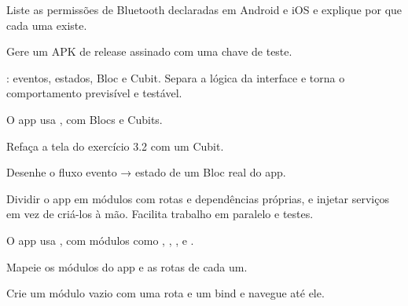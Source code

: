 \begin{pratique}
  \item Liste as permissões de Bluetooth declaradas em Android e iOS e explique por que cada uma existe.
  \item Gere um APK de release assinado com uma chave de teste.
\end{pratique}


: eventos, estados, Bloc e Cubit. Separa a lógica da interface e torna o comportamento previsível e testável.

\begin{noproduto}
O app usa , com Blocs e Cubits.
\end{noproduto}

\begin{paraestudar}
  \item {}
\end{paraestudar}

\begin{pratique}
  \item Refaça a tela do exercício 3.2 com um Cubit.
  \item Desenhe o fluxo evento → estado de um Bloc real do app.
\end{pratique}

Dividir o app em módulos com rotas e dependências próprias, e injetar serviços em vez de criá-los à mão. Facilita trabalho em paralelo e testes.

\begin{noproduto}
O app usa , com módulos como , , ,  e .
\end{noproduto}

\begin{paraestudar}
  \item {}
\end{paraestudar}

\begin{pratique}
  \item Mapeie os módulos do app e as rotas de cada um.
  \item Crie um módulo vazio com uma rota e um bind e navegue até ele.
\end{pratique}

